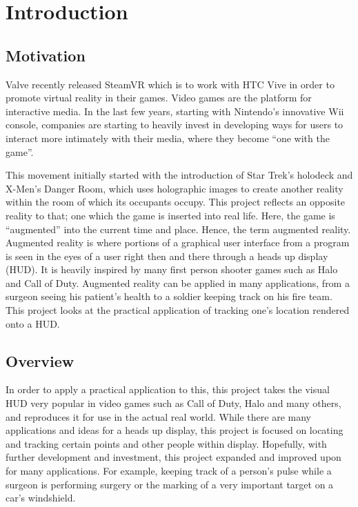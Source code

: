 
\chapter{Introduction} %

\label{Introduction} %


\section{Motivation}

Valve recently released SteamVR which is to work with HTC Vive in order to promote virtual reality in their games. Video games are the platform for interactive media. In the last few years, starting with Nintendo’s innovative Wii console, companies are starting to heavily invest in developing ways for users to interact more intimately with their media, where they become “one with the game”. 

This movement initially started with the introduction of Star Trek’s holodeck and X-Men’s Danger Room, which uses holographic images to create another reality within the room of which its occupants occupy. This project reflects an opposite reality to that; one which the game is inserted into real life. Here, the game is “augmented” into the current time and place. Hence, the term augmented reality. Augmented reality is where portions of a graphical user interface from a program is seen in the eyes of a user right then and there through a heads up display (HUD). It is heavily inspired by many first person shooter games such as Halo and Call of Duty. Augmented reality can be applied in many applications, from a surgeon seeing his patient’s health to a soldier keeping track on his fire team. This project looks at the practical application of tracking one’s location rendered onto a HUD.

\section{Overview}

In order to apply a practical application to this, this project takes the visual HUD very popular in video games such as Call of Duty, Halo and many others, and reproduces it for use in the actual real world. While there are many applications and ideas for a heads up display, this project is focused on locating and tracking certain points and other people within display. Hopefully, with further development and investment, this project expanded and improved upon for many applications. For example, keeping track of a person’s pulse while a surgeon is performing surgery or the marking of a very important target on a car’s windshield.

